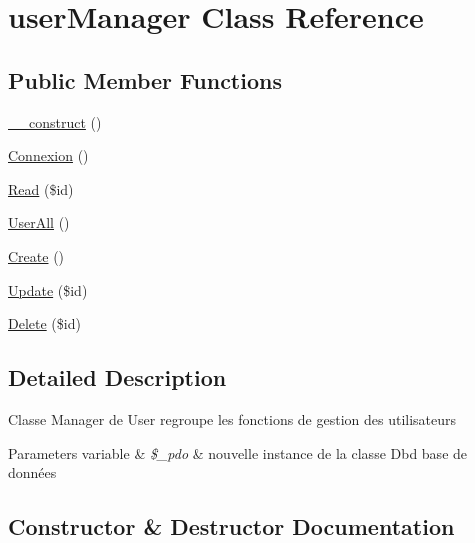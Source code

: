 \hypertarget{class_src_1_1_managers_1_1user_manager}{}\section{user\+Manager Class Reference}
\label{class_src_1_1_managers_1_1user_manager}
\subsection*{Public Member Functions}
\begin{DoxyCompactItemize}
\item 
\hyperlink{class_src_1_1_managers_1_1user_manager_a095c5d389db211932136b53f25f39685}{\+\_\+\+\_\+construct} ()
\item 
\hyperlink{class_src_1_1_managers_1_1user_manager_a00fdd5c0ca353b468ea33fb246c28d90}{Connexion} ()
\item 
\hyperlink{class_src_1_1_managers_1_1user_manager_ad2bbc9b3130abdfe3a9fc9e9fe36716f}{Read} (\$id)
\item 
\hyperlink{class_src_1_1_managers_1_1user_manager_a0a377befd1052a5f989fd915af31373b}{User\+All} ()
\item 
\hyperlink{class_src_1_1_managers_1_1user_manager_ad01f71fa0ecc039494e3c282864298c3}{Create} ()
\item 
\hyperlink{class_src_1_1_managers_1_1user_manager_a82232b33fbfacdbdb8a8f49acaecf564}{Update} (\$id)
\item 
\hyperlink{class_src_1_1_managers_1_1user_manager_a59113b5ecd1d155db6a4f30af34a1e80}{Delete} (\$id)
\end{DoxyCompactItemize}


\subsection{Detailed Description}
Classe Manager de User regroupe les fonctions de gestion des utilisateurs 
\begin{DoxyParams}[1]{Parameters}
variable & {\em \$\+\_\+pdo} & nouvelle instance de la classe Dbd base de données \\
\hline
\end{DoxyParams}


\subsection{Constructor \& Destructor Documentation}
\mbox{\label{class_src_1_1_managers_1_1user_manager_a095c5d389db211932136b53f25f39685}} 

